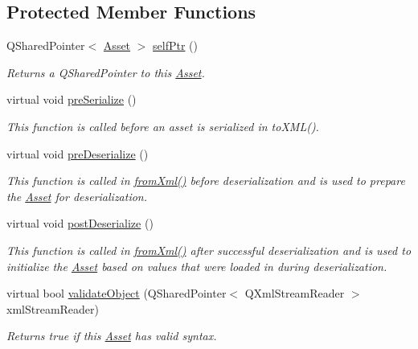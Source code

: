 \subsection*{Protected Member Functions}
\begin{DoxyCompactItemize}
\item 
Q\-Shared\-Pointer$<$ \hyperlink{class_picto_1_1_asset}{Asset} $>$ \hyperlink{class_picto_1_1_asset_ac6727fc4ef394103880e570c4b40d091}{self\-Ptr} ()
\begin{DoxyCompactList}\small\item\em Returns a Q\-Shared\-Pointer to this \hyperlink{class_picto_1_1_asset}{Asset}. \end{DoxyCompactList}\item 
virtual void \hyperlink{class_picto_1_1_asset_aabba6c76cc003a76e65be7b96390fdd9}{pre\-Serialize} ()
\begin{DoxyCompactList}\small\item\em This function is called before an asset is serialized in to\-X\-M\-L(). \end{DoxyCompactList}\item 
virtual void \hyperlink{class_picto_1_1_asset_a3ea72c7a57437c7371d791277b39aa41}{pre\-Deserialize} ()
\begin{DoxyCompactList}\small\item\em This function is called in \hyperlink{class_picto_1_1_asset_a8bed4da09ecb1c07ce0dab313a9aba67}{from\-Xml()} before deserialization and is used to prepare the \hyperlink{class_picto_1_1_asset}{Asset} for deserialization. \end{DoxyCompactList}\item 
virtual void \hyperlink{class_picto_1_1_asset_a40a6b15b05855f8cb392e29d31d80914}{post\-Deserialize} ()
\begin{DoxyCompactList}\small\item\em This function is called in \hyperlink{class_picto_1_1_asset_a8bed4da09ecb1c07ce0dab313a9aba67}{from\-Xml()} after successful deserialization and is used to initialize the \hyperlink{class_picto_1_1_asset}{Asset} based on values that were loaded in during deserialization. \end{DoxyCompactList}\item 
virtual bool \hyperlink{class_picto_1_1_asset_a2b2cc1ab81322b5280d66b020205f6aa}{validate\-Object} (Q\-Shared\-Pointer$<$ Q\-Xml\-Stream\-Reader $>$ xml\-Stream\-Reader)
\begin{DoxyCompactList}\small\item\em Returns true if this \hyperlink{class_picto_1_1_asset}{Asset} has valid syntax. \end{DoxyCompactList}\item 

\end{DoxyCompactItemize}
